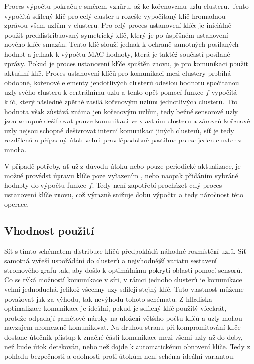 \documentclass[11pt,final,twoside]{fithesis2}
\begin{document}
Proces výpočtu pokračuje směrem vzhůru, až ke kořenovému uzlu clusteru. Tento vypočítá sdílený klíč pro celý cluster a rozešle vypočítaný klíč hromadnou zprávou všem uzlům v clusteru. 
Pro celý proces ustanovení klíče je iniciálně použit preddistribuovaný symetrický klíč, který je po úspěšném ustanovení nového klíče smazán. Tento klíč slouží jednak k ochraně samotných posílaných 
hodnot a jednak k výpočtu MAC hodnoty, která je taktéž součástí posílané zprávy. Pokud je proces ustanovení klíče spuštěn znovu, je pro komunikaci použit aktuální klíč. Proces ustanovení klíčů pro 
komunikaci mezi clustery probíhá obdobně, kořenové elementy jendotlivých clusterů odešlou hodnotu spočítanou uzly svého clusteru k centrálnímu uzlu a tento opět pomocí funkce $f$ vypočítá klíč, který 
následně zpětně zasílá kořenovým uzlům jednotlivých clusterů. Tto hodnota však zůstává známa jen kořenovým uzlům, tedy bežné sensorové uzly jsou schopné dešifrovat pouze komunikaci ve vlastním clusteru
a zároveň kořenové uzly nejsou schopné dešivrovat interní komunikaci jiných clusterů, síť je tedy rozdělená a případný útok velmi pravděpodobně postihne pouze jeden cluster z mnoha. 

V případě potřeby, ať už z důvodu útoku nebo pouze periodické aktualizace, je možné provédst úpravu klíče poze vyřazením , nebo naopak přidáním vybráné hodnoty do výpočtu funkce $f$. Tedy není zapotřebí
procházet celý proces ustanovení klíče znovu, což výrazně snižuje dobu výpočtu a tedy náročnost této operace. 

\subsection{Vhodnost použití}

Síť s tímto schématem distribuce klíčů předpokládá náhodné rozmístění uzlů. Síť samotná vyřeší uspořádání do clusterů a nejvhodnější 
variatu sestavení stromového grafu tak, aby došlo k optimálnímu pokrytí oblasti pomocí sensorů. Co se týká možností komunikace
v síti, v rámci jednoho clusterů je komunikace velmi jednoduchá, jelikož všechny uzy sdílejí stejný klíč. Tuto vlastnost můžeme považovat 
jak za výhodu, tak nevýhodu tohoto schématu. Z hllediska optimalizace komunikace je ideální, pokud je sdílený klíč použitý vícekrát, 
protože odpadají paměťové nároky na uložení většího počtu klíčů a uzly mohou navzájem neomezeně komunikovat. Na druhou stranu při 
kompromitování klíče dostane útočník přístup k značné části komunikace mezi všemi uzly až do doby, než bude útok detekován, nebo než 
dojde k automatickému obnovení klíče. Tedy z pohledu bezpečnosti a odolnosti proti útokům není schéma ideální variantou. 
\end{document}
